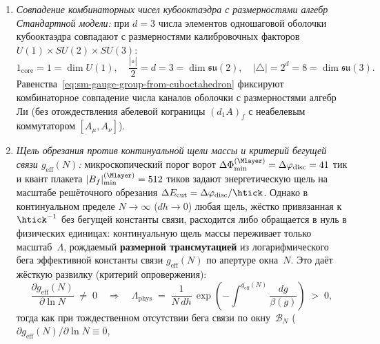\begin{proposition}
\begin{enumerate}[label=(\roman*)]
\begin{enumerate}[label=(\alph*)]
    $\sum_{f\in 8\triangle\cup 6\square} n_f \equiv 0$ ($n_f\in\mathbb{Z}$), есть прямое алгебраическое следствие точности кограничного оператора
    $B_f = (d_1 A)_f = 512\,n_f$: оно запрещает уединённый поток через одну грань ($n_{f_1}=\pm 1$ при остальных $n_f=0$),
    допуская лишь комбинации с нулевой суммой --- диполь $(+1,-1)$ ($1-1=0$) и трёхгранный угол~$K_3$ с потоками $(+1,+1,-2)$ ($1+1-2=0$).
  \item \emph{Совпадение комбинаторных чисел кубооктаэдра с размерностями алгебр Стандартной модели:}
    при $d=3$ числа элементов одношаговой оболочки кубооктаэдра совпадают с размерностями калибровочных факторов $U(1)\times SU(2)\times SU(3)$:
    \begin{equation}
    \label{eq:sm-gauge-group-from-cuboctahedron}
      1_{\mathrm{core}} = 1 = \dim U(1),
      \quad
      \frac{|\square|}{2} = d = 3 = \dim\mathfrak{su}(2),
      \quad
      |\triangle| = 2^d = 8 = \dim\mathfrak{su}(3).
    \end{equation}
    Равенства~\eqref{eq:sm-gauge-group-from-cuboctahedron} фиксируют комбинаторное совпадение числа каналов оболочки с размерностями алгебр Ли
    (без отождествления абелевой кограницы $(d_1 A)_f$ с неабелевым коммутатором $[A_\mu,A_\nu]$).
  \item \emph{Щель обрезания против континуальной щели массы и критерий бегущей связи $g_{\mathrm{eff}}(N)$:}
    микроскопический порог ворот $\Delta\Phi_{\min}^{(\Mlayer)} = \Delta\varphi_{\mathrm{disc}} = 41$ тик и квант плакета $|B_f|_{\min}^{(\Mlayer)} = 512$ тиков
    задают энергетическую щель на масштабе решёточного обрезания $\Delta E_{\mathrm{cut}} = \Delta\varphi_{\mathrm{disc}}/\htick$.
    Однако в континуальном пределе $N\to\infty$ ($dh\to 0$) любая щель, жёстко привязанная к $\htick^{-1}$ без бегущей константы связи,
    расходится либо обращается в нуль в физических единицах: континуальную щель массы переживает только масштаб~$\Lambda$,
    рождаемый \textbf{размерной трансмутацией} из логарифмического бега эффективной константы связи $g_{\mathrm{eff}}(N)$ по апертуре окна~$N$.
    Это даёт жёсткую развилку (критерий опровержения):
    \begin{equation}
    \label{eq:yang-mills-mass-gap}
      \frac{\partial g_{\mathrm{eff}}(N)}{\partial\ln N} \;\ne\; 0
      \quad\Longrightarrow\quad
      \Lambda_{\mathrm{phys}} \;=\; \frac{1}{N\,dh}\,\exp\!\left(-\int^{g_{\mathrm{eff}}(N)}\!\frac{dg}{\beta(g)}\right) \;>\; 0,
    \end{equation}
    тогда как при тождественном отсутствии бега связи по окну~$\mathcal{B}_N$ ($\partial g_{\mathrm{eff}}(N)/\partial\ln N \equiv 0$,

\end{enumerate}
\end{enumerate}
\end{proposition}
